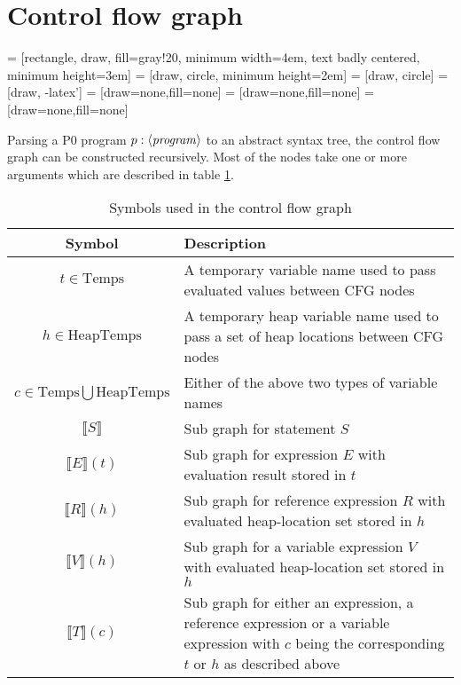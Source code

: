 \section{Control flow graph}
\label{sec:cfg}
 = [rectangle, draw, fill=gray!20,  minimum width=4em, text badly centered, minimum height=3em]
 = [draw, circle, minimum height=2em]
 = [draw, circle]
 = [draw, -latex']
 = [draw=none,fill=none]
 = [draw=none,fill=none]
 = [draw=none,fill=none]
\newcommand{\subt}[1]{\llbracket #1\rrbracket}

Parsing a P0 program $p : \langle\mathit{program}\rangle$ to an abstract syntax tree, the control flow graph can be constructed recursively. Most of the nodes take one or more arguments which are described in table \ref{tab:nodes}.

\begin{table}[htbp]
\centering
\begin{tabularx}{\textwidth}{c|X}
 Symbol & Description \\\hline\hline
 $t \in \text{Temps}$ & A temporary variable name used to pass evaluated values between CFG nodes \\
 $h \in \text{HeapTemps}$ & A temporary heap variable name used to pass a set of heap locations between CFG nodes \\
 $c \in \text{Temps}\bigcup\text{HeapTemps}$ & Either of the above two types of variable names \\
 $\subt{S}$ & Sub graph for statement $S$ \\
 $\subt{E}(t)$ & Sub graph for expression $E$ with evaluation result stored in $t$ \\
 $\subt{R}(h)$ & Sub graph for reference expression $R$ with evaluated heap-location set stored in $h$ \\
 $\subt{V}(h)$ & Sub graph for a variable expression $V$ with evaluated heap-location set stored in $h$ \\
 $\subt{T}(c)$ & Sub graph for either an expression, a reference expression or a variable expression with $c$ being the corresponding $t$ or $h$ as described above
\end{tabularx}
\caption{Symbols used in the control flow graph}
\label{tab:nodes}
\end{table}


